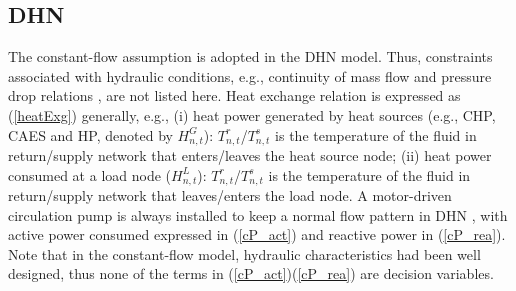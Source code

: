 \documentclass[journal,twoside,web]{ieeecolor}
\begin{document}
\subsection{DHN}
The constant-flow assumption \cite{dhnmdotfix} is adopted in the DHN model.
Thus, constraints associated with hydraulic conditions, e.g., continuity of mass flow and pressure drop relations \cite{dhnModel}, are not listed here.
Heat exchange relation is expressed as (\ref{heatExg}) generally, e.g., (i) heat power generated by heat sources (e.g., CHP, CAES and HP, denoted by $H^{G}_{n,t}$): $T^r_{n,t}$/$T^s_{n,t}$ is the temperature of the fluid in return/supply network that enters/leaves the heat source node; (ii) heat power consumed at a load node ($H^{L}_{n,t}$): $T^r_{n,t}$/$T^s_{n,t}$ is the temperature of the fluid in return/supply network that leaves/enters the load node.
A motor-driven circulation pump is always installed to keep a normal flow pattern in DHN \cite{Dissert}, with active power consumed expressed in (\ref{cP_act}) and reactive power in (\ref{cP_rea}).
Note that in the constant-flow model, hydraulic characteristics had been well designed, thus none of the terms in (\ref{cP_act})(\ref{cP_rea}) are decision variables.
\end{document}
